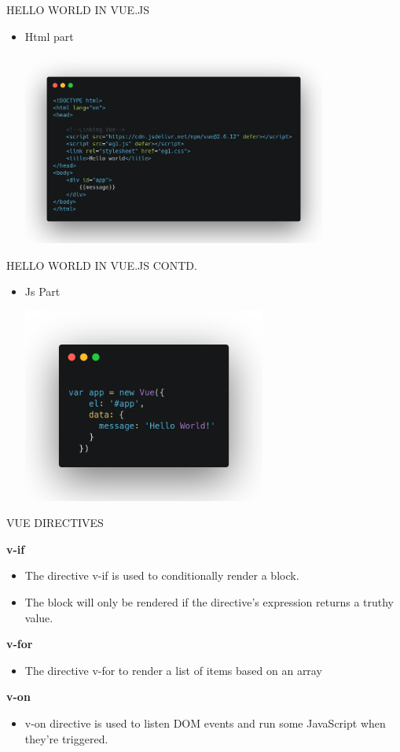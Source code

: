 \documentclass[aspectratio=169, 169]{beamer}
\newcommand\myheading[1]{%
  \par\bigskip
  {\Large\bfseries#1}\par\smallskip}
\begin{document}
\begin{frame}{HELLO WORLD IN VUE.JS}
\begin{itemize}
\item  Html part
\linebreak

\center\includegraphics[width=10cm]{vuehelloworld.png}
\end{itemize}
\end{frame}
\begin{frame}{HELLO WORLD IN VUE.JS CONTD.}
\begin{itemize}
\item Js Part
\linebreak

\center\includegraphics[width=8cm]{helloWorldJs.png}
\end{itemize}
\end{frame}
\begin{frame}{VUE DIRECTIVES}
  \myheading{v-if}
  \begin{itemize}
      \item The directive v-if is used to conditionally render a block. 
      \item The block will only be rendered if the directive’s expression returns a truthy value.
  \end{itemize}
   \myheading{v-for}
  \begin{itemize}
      \item The directive v-for to render a list of items based on an array 
      
  \end{itemize}
  \myheading{v-on}
  \begin{itemize}
      \item  v-on directive is used  to listen DOM events and run some JavaScript when they’re triggered. 
      
  \end{itemize}
\end{frame}
\end{document}

